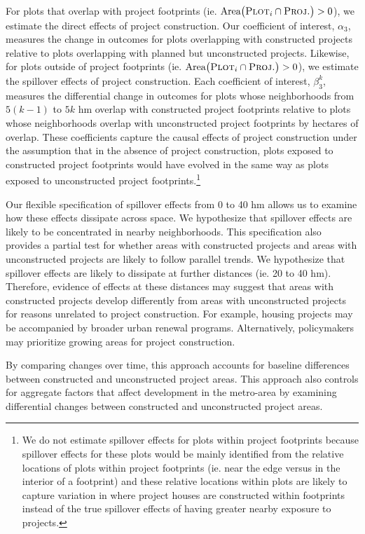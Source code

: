 \documentclass[12pt]{article}
\begin{document}
For plots that overlap with project footprints (ie. $\text{Area}\big(\textsc{Plot}_i  \cap  \textsc{Proj.}\big)>0$), we estimate the direct effects of project construction.  Our coefficient of interest, $\alpha_3$, measures the change in outcomes for plots overlapping with constructed projects relative to plots overlapping with planned but unconstructed projects.  Likewise, for plots outside of project footprints (ie. $\text{Area}\big(\textsc{Plot}_i  \cap  \textsc{Proj.}\big)>0$), we estimate the spillover effects of project construction.  Each coefficient of interest, $\beta_3^{k}$, measures the differential change in outcomes for plots whose neighborhoods from $5(k-1)$ to $5k$ hm overlap with constructed project footprints relative to plots whose neighborhoods overlap with unconstructed project footprints by hectares of overlap.  These coefficients capture the causal effects of project construction under the assumption that in the absence of project construction, plots exposed to constructed project footprints would have evolved in the same way as plots exposed to unconstructed project footprints.\footnote{We do not estimate spillover effects for plots within project footprints because spillover effects for these plots would be mainly identified from the relative locations of plots within project footprints (ie. near the edge versus in the interior of a footprint) and these relative locations within plots are likely to capture variation in where project houses are constructed within footprints instead of the true spillover effects of having greater nearby exposure to projects.}

Our flexible specification of spillover effects from 0 to 40 hm allows us to examine how these effects dissipate across space.  We hypothesize that spillover effects are likely to be concentrated in nearby neighborhoods.  This specification also provides a partial test for whether areas with constructed projects and areas with unconstructed projects are likely to follow parallel trends.  We hypothesize that spillover effects are likely to dissipate at further distances (ie. 20 to 40 hm).  Therefore, evidence of effects at these distances may suggest that areas with constructed projects develop differently from areas with unconstructed projects for reasons unrelated to project construction.  For example, housing projects may be accompanied by broader urban renewal programs.  Alternatively, policymakers may prioritize growing areas for project construction.

By comparing changes over time, this approach accounts for baseline differences between constructed and unconstructed project areas.  This approach also controls for aggregate factors that affect development in the metro-area by examining differential changes between constructed and unconstructed project areas.  
\end{document}
